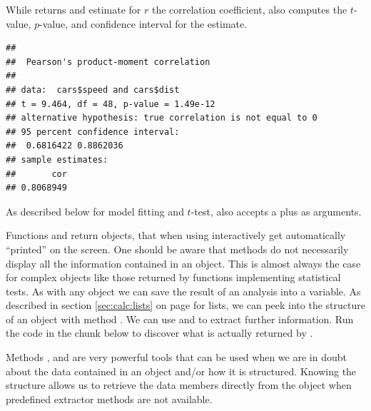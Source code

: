 \documentclass[krantz2]{krantz}\usepackage{knitr}
\begin{document}
While  returns and estimate for $r$ the correlation coefficient,  also computes the $t$-value, $p$-value, and confidence interval for the estimate.

\begin{knitrout}\footnotesize
{}\color{fgcolor}\begin{kframe}
\begin{alltt}
\hlstd{(} \hlopt{$}  \hlopt{$}
\end{alltt}
\begin{verbatim}
## 
## 	Pearson's product-moment correlation
## 
## data:  cars$speed and cars$dist
## t = 9.464, df = 48, p-value = 1.49e-12
## alternative hypothesis: true correlation is not equal to 0
## 95 percent confidence interval:
##  0.6816422 0.8862036
## sample estimates:
##       cor 
## 0.8068949
\end{verbatim}
\end{kframe}
\end{knitrout}

As described below for model fitting and $t$-test,  also accepts a  plus  as arguments.

\begin{playground}
Functions  and  return \Rlang objects, that when using \Rlang interactively get automatically ``printed'' on the screen. One should be aware that  methods do not necessarily display all the information contained in an \Rlang object. This is almost always the case for complex objects like those returned by \Rlang functions implementing statistical tests. As with any \Rlang object we can save the result of an analysis into a variable. As described in section \ref{sec:calc:lists} on page \pageref{sec:calc:lists} for lists, we can peek into the structure of an object with method . We can use  and  to extract further information. Run the code in the chunk below to discover what is actually returned by .

\begin{knitrout}\footnotesize
{}\color{fgcolor}\begin{kframe}
\begin{alltt}
 \hlkwb{<-} 
\end{alltt}
\end{kframe}
\end{knitrout}

Methods ,  and  are very powerful tools that can be used when we are in doubt about the data contained in an object and/or how it is structured. Knowing the structure allows us to retrieve the data members directly from the object when predefined extractor methods are not available.
\end{playground}
\end{document}
